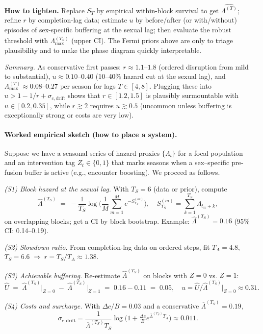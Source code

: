 \documentclass[11pt]{article}
\theoremstyle{upright}
\newcommand{\hazT}[1]{\Lambda^{(#1)}}          %
\newcommand{\hazmaxT}[1]{\Lambda^{(#1)}_{\max}}%
\begin{document}
\medskip
\noindent\textbf{How to tighten.}
Replace \(S_T\) by empirical within-block survival to get \(\widehat{\hazT{T}}\); refine \(r\) by completion-lag data;
estimate \(u\) by before/after (or with/without) episodes of sex-specific buffering at the sexual lag; then evaluate the
robust threshold with \(\overline{\hazmaxT{T_S}}\) (upper CI). The Fermi priors above are only to triage plausibility and
to make the phase diagram quickly interpretable.

\noindent\emph{Summary.} As conservative first passes: \(r\approx 1.1\text{–}1.8\) (ordered disruption from mild to substantial), \(u\approx 0.10\text{–}0.40\) (10–40\% hazard cut at the sexual lag), and \(\hazmaxT{T}\approx 0.08\text{–}0.27\) per season for lags \(T\in[4,8]\). Plugging these into \(u>1-1/r+\sigma_{c,\mathrm{drift}}\) shows that \(r\in[1.2,1.5]\) is plausibly surmountable with \(u\in[0.2,0.35]\), while \(r\gtrsim 2\) requires \(u\gtrsim 0.5\) (uncommon unless buffering is exceptionally strong or costs are very low).

\paragraph{Worked empirical sketch (how to place a system).}
Suppose we have a seasonal series of hazard proxies \(\{\Lambda_t\}\) for a focal population and an intervention tag \(Z_t\in\{0,1\}\) that marks seasons when a sex–specific pre-fusion buffer is active (e.g., encounter boosting). We proceed as follows.

\emph{(S1) Block hazard at the sexual lag.} With \(T_S=6\) (data or prior), compute
\[
\widehat{\Lambda}^{(T_S)}\;=\;-\frac{1}{T_S}\log\!\Big(\frac{1}{M}\sum_{m=1}^{M} e^{-S_{T_S}^{(m)}}\Big),\quad S_{T_S}^{(m)}=\sum_{k=1}^{T_S}\Lambda_{t_m+k},
\]
on overlapping blocks; get a CI by block bootstrap. Example: \(\widehat{\Lambda}^{(T_S)}=0.16\) (95\% CI: 0.14–0.19).

\emph{(S2) Slowdown ratio.} From completion-lag data on ordered steps, fit \(T_A=4.8\), \(T_S=6.6\) \(\Rightarrow\ r=T_S/T_A\approx 1.38\).

\emph{(S3) Achievable buffering.} Re-estimate \(\widehat{\Lambda}^{(T_S)}\) on blocks with \(Z=0\) vs. \(Z=1\):
\[
\widehat{U}\;=\;\widehat{\Lambda}^{(T_S)}\!\big|_{Z=0}\;-\;\widehat{\Lambda}^{(T_S)}\!\big|_{Z=1}\;=\;0.16-0.11\;=\;0.05,
\quad u=\widehat{U}/\widehat{\Lambda}^{(T_S)}\!\big|_{Z=0}\approx 0.31.
\]

\emph{(S4) Costs and surcharge.} With \(\Delta c/B=0.03\) and a conservative \(\overline{\Lambda}^{(T_S)}=0.19\),
\[
\sigma_{c,\mathrm{drift}}
= \frac{1}{\overline{\Lambda}^{(T_S)}T_S}\log\!\Big(1+\tfrac{\Delta c}{B}e^{\overline{\Lambda}^{(T_S)}T_A}\Big)
\approx 0.011.
\]
\end{document}
